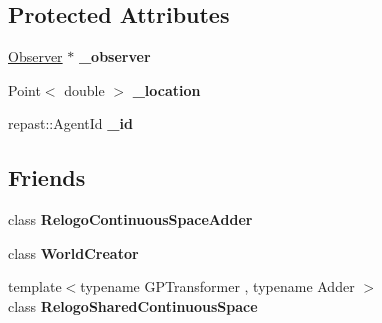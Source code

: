 \subsection*{Protected Attributes}
\begin{DoxyCompactItemize}
\item 
\hypertarget{classrepast_1_1relogo_1_1_relogo_agent_a1602e1180db11cdde666ac2beca0e0a2}{\hyperlink{classrepast_1_1relogo_1_1_observer}{Observer} $\ast$ {\bfseries \-\_\-observer}}\label{classrepast_1_1relogo_1_1_relogo_agent_a1602e1180db11cdde666ac2beca0e0a2}

\item 
\hypertarget{classrepast_1_1relogo_1_1_relogo_agent_ab71970dcf25d263c02b58ad645406f6f}{Point$<$ double $>$ {\bfseries \-\_\-location}}\label{classrepast_1_1relogo_1_1_relogo_agent_ab71970dcf25d263c02b58ad645406f6f}

\item 
\hypertarget{classrepast_1_1relogo_1_1_relogo_agent_a4745c9c678747f179ac788299da51983}{repast\-::\-Agent\-Id {\bfseries \-\_\-id}}\label{classrepast_1_1relogo_1_1_relogo_agent_a4745c9c678747f179ac788299da51983}

\end{DoxyCompactItemize}
\subsection*{Friends}
\begin{DoxyCompactItemize}
\item 
\hypertarget{classrepast_1_1relogo_1_1_relogo_agent_a9357229e3d8becac7ea9ce4fc821c8b6}{class {\bfseries Relogo\-Continuous\-Space\-Adder}}\label{classrepast_1_1relogo_1_1_relogo_agent_a9357229e3d8becac7ea9ce4fc821c8b6}

\item 
\hypertarget{classrepast_1_1relogo_1_1_relogo_agent_a8d256944f28ec0cd654da58d4dcff11c}{class {\bfseries World\-Creator}}\label{classrepast_1_1relogo_1_1_relogo_agent_a8d256944f28ec0cd654da58d4dcff11c}

\item 
\hypertarget{classrepast_1_1relogo_1_1_relogo_agent_a36ecfaff22237c775324f8e1db5b5610}{{\footnotesize template$<$typename G\-P\-Transformer , typename Adder $>$ }\\class {\bfseries Relogo\-Shared\-Continuous\-Space}}\label{classrepast_1_1relogo_1_1_relogo_agent_a36ecfaff22237c775324f8e1db5b5610}

\end{DoxyCompactItemize}


